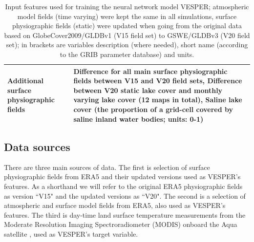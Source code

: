 \documentclass[hess, twostagejnl]{copernicus}
\begin{document}
\begin{table}
\begin{tabularx}{\textwidth}{lX}
		\\
		Additional surface physiographic fields               & Difference for all main surface physiographic fields between V15 and V20 field sets, \newline 
		Difference between V20 static lake cover and monthly varying lake cover (12 maps in total),\newline 
		Saline lake cover (the proportion of a grid-cell covered by saline inland water bodies; units: 0-1)
		 \\
		\hline
	\end{tabularx}
\caption{Input features used for training the neural network model VESPER; atmospheric model fields (time varying) were kept the same in all simulations,  surface  physiographic  fields  (static)  were  updated  when  going  from  the  original  data  based  on GlobeCover2009/GLDBv1 (V15 field set) to GSWE/GLDBv3 (V20 field set); in brackets are variables description (where needed), short name (according to the GRIB parameter database) and units.
}
\label{table:definitions}
\end{table}

\subsection{Data sources }

There are three main sources of data. The first is selection of surface physiographic fields from ERA5 \citep{Hersbach} and their updated versions \citep{Choulga2019,Boussetta2021,Mu2021} used as VESPER’s features. As a shorthand we will refer to the original ERA5 physiographic fields as version ``V15" and the updated versions as ``V20". The second is a selection of atmospheric and surface model fields from ERA5, also used as VESPER’s features. The third is day-time land surface temperature measurements from the Moderate Resolution Imaging Spectroradiometer (MODIS) onboard the Aqua satellite \citep{MODIS}, used as VESPER’s target variable. 
\end{document}
